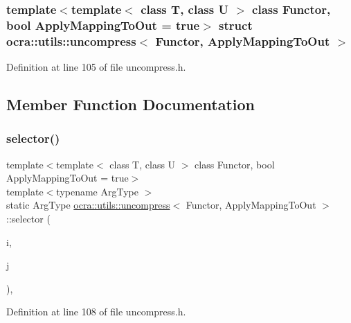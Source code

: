 \subsubsection*{template$<$template$<$ class T, class U $>$ class Functor, bool Apply\+Mapping\+To\+Out = true$>$\newline
struct ocra\+::utils\+::uncompress$<$ Functor, Apply\+Mapping\+To\+Out $>$}



Definition at line 105 of file uncompress.\+h.



\subsection{Member Function Documentation}
\hypertarget{structocra_1_1utils_1_1uncompress_ad248d8421851c3ec4f9a47263b8b3185}{}\label{structocra_1_1utils_1_1uncompress_ad248d8421851c3ec4f9a47263b8b3185} 
\subsubsection{\texorpdfstring{selector()}{selector()}}
{\footnotesize\ttfamily template$<$template$<$ class T, class U $>$ class Functor, bool Apply\+Mapping\+To\+Out = true$>$ \\
template$<$typename Arg\+Type $>$ \\
static Arg\+Type \hyperlink{structocra_1_1utils_1_1uncompress}{ocra\+::utils\+::uncompress}$<$ Functor, Apply\+Mapping\+To\+Out $>$\+::selector (\begin{DoxyParamCaption}\item[{Arg\+Type}]{i,  }\item[{Arg\+Type}]{j }\end{DoxyParamCaption})\hspace{0.3cm}{\ttfamily [inline]}, {\ttfamily [static]}}



Definition at line 108 of file uncompress.\+h.

\hypertarget{structocra_1_1utils_1_1uncompress_a2c95e21b384c1b0a4c471c45a03fc1a2}{}\label{structocra_1_1utils_1_1uncompress_a2c95e21b384c1b0a4c471c45a03fc1a2} 
